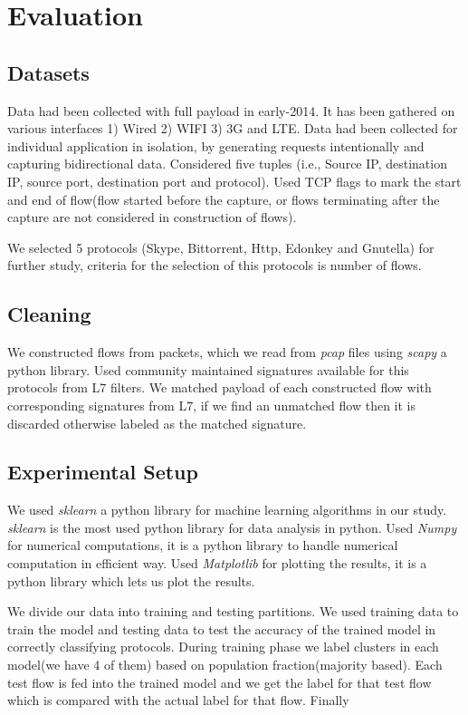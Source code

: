 \documentclass[conference]{IEEEtran}
\begin{document}
\section{Evaluation}
\subsection{Datasets}
Data had been collected with full payload in early-2014. It has been gathered on various interfaces 1) Wired 2) WIFI 3) 3G and LTE. Data had been collected for individual application in isolation, by generating requests intentionally and capturing bidirectional data.  Considered five tuples (i.e., Source IP, destination IP, source port, destination port and protocol). Used TCP flags to mark the start and end of flow(flow started before the capture, or flows terminating after the capture are not considered in construction of flows). 

We selected 5 protocols (Skype, Bittorrent, Http, Edonkey and Gnutella) for further study, criteria for the selection of this protocols is number of flows. 
\subsection{Cleaning}
We constructed flows from packets, which we read from \emph{pcap} files using \emph{scapy} a python library. Used community maintained signatures\cite{} available for this protocols from L7 filters. We matched payload of each constructed flow with corresponding signatures from L7, if we find an unmatched flow then it is discarded otherwise labeled as the matched signature.

\subsection{Experimental Setup}
We used \emph{sklearn} a python library for machine learning algorithms in our study. \emph{sklearn} is the most used python library for data analysis in python. Used \emph{Numpy} for numerical computations, it is a python library to handle numerical computation in efficient way. Used \emph{Matplotlib} for plotting the results, it is a python library which lets us plot the results. 

We divide our data into training and testing partitions. We used training data to train the model and testing data to test the accuracy of the trained model in correctly classifying protocols. 
During training phase we label clusters in each model(we have 4 of them) based on population fraction(majority based). Each test flow is fed into the trained model and we get the label for that test flow which is compared with the actual label for that flow. Finally 
\end{document}
